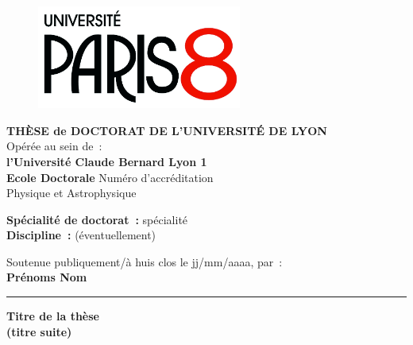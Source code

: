 \usepackage{graphicx}
\usepackage[T1]{fontenc}
\usepackage[utf8]{inputenc}
\usepackage[french]{babel}


\begin{titlepage}

\unitlength 1cm
\begin{center}

\vspace*{-2.5cm}
\begin{figure}[h]
    \centering
    \includegraphics[width=0.6\textwidth]{images/Logo-P8.jpg}
\end{figure}



           {\large\bf THÈSE de DOCTORAT DE L'UNIVERSITÉ DE LYON\\}
           {Opérée au sein de~:\\}
           {\large \bf l'Université Claude Bernard Lyon 1\\}
\vspace{12pt}
           {\large \textbf{Ecole Doctorale} Numéro d'accréditation \\Physique et Astrophysique}


\vspace{12pt}

           {\large \textbf{Spécialité de doctorat~:} spécialité \\}
           {\large \textbf{Discipline~:} (éventuellement)}

\vspace{0.8cm}

           {Soutenue publiquement/à huis clos le jj/mm/aaaa, par~:\\}
           {\Large\bf {Prénoms Nom}}
\vspace{0.5cm}           


\rule{5cm}{1pt}

\vspace{12pt}
           
           {\LARGE \bf Titre de la thèse}\\
           \vspace{0.3cm}
           {\Large \bf (titre suite)}
           

\end{center}
\end{titlepage}
